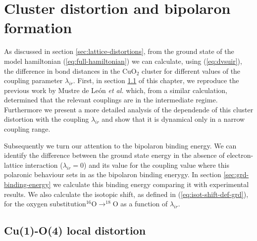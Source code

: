 \chapter{Cluster distortion and bipolaron formation}
\label{chap:ground}

As discussed in section \ref{sec:lattice-distortions}, from the ground state of the model hamiltonian (\ref{eq:full-hamiltonian}) we can calculate, using (\ref{eq:dvsuir}), the difference in bond distances in the CuO$_2$ cluster for different values of the coupling parameter $\lambda_{ir}$.
First, in section \ref{sec:grd-phonon-proj} of this chapter, we reproduce the previous work by Mustre de Le\'{o}n \textit{et al.} \cite{MustredeLeon1992} which, from a similar calculation, determined that the relevant couplings are in the intermediate regime. Furthermore we present a more detailed analysis of the dependende of this cluster distortion with the coupling $\lambda_{ir}$ and show that it is dynamical only in a narrow coupling range.

Subsequently we turn our attention to the bipolaron binding energy. 
We can identify the difference between the ground state energy in the absence of electron-lattice interaction ($\lambda_{ir}=0$) and its value for the coupling value where this polaronic behaviour sets in as the bipolaron binding enerygy.
In section \ref{sec:grd-binding-energy} we calculate this binding energy comparing it with experimental results.
We also calculate the isotopic shift, as defined in (\ref{eq:isot-shift-def-grd}), for the oxygen substitution$^{16}$O$\rightarrow ^{18}$O as a function of $\lambda_{ir}$.

\section{Cu(1)-O(4) local distortion}
\label{sec:grd-phonon-proj}


